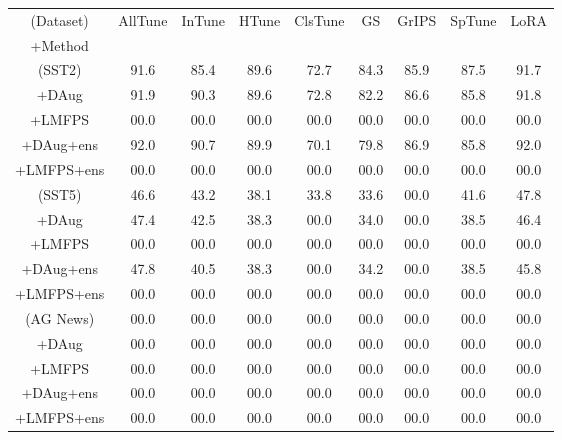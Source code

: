 \documentclass[11pt]{article}
\begin{document}
\begin{table*}
\begin{tabular}{c | c | c | c | c | c | c | c | c}
\hline
(Dataset) & AllTune & InTune & HTune & ClsTune & GS & GrIPS & SpTune & LoRA \\
\small+Method &  &  &  &  &  &  &  &  \\
\hline
(SST2) & \small91.6 & \small85.4 & \small89.6 & \small72.7 & \small84.3 & \small85.9 & \small87.5 & \small91.7 \\
\small+DAug & \small91.9 & \small90.3 & \small89.6 & \small72.8 & \small82.2 & \small86.6 & \small85.8 & \small91.8\\
\small+LMFPS  & \small00.0 & \small00.0 & \small00.0 & \small00.0 & \small00.0 & \small00.0 & \small00.0 & \small00.0\\
\small+DAug+ens & \small92.0 & \small90.7 & \small89.9 & \small70.1 & \small79.8 & \small86.9 & \small85.8 & \small92.0\\
\small+LMFPS+ens  & \small00.0 & \small00.0 & \small00.0 & \small00.0 & \small00.0 & \small00.0 & \small00.0 & \small00.0\\
\hline
(SST5) & \small46.6 & \small43.2 & \small38.1 & \small33.8 & \small33.6 & \small00.0 & \small41.6 & \small47.8\\
\small+DAug & \small47.4 & \small42.5 & \small38.3 & \small00.0 & \small34.0 & \small00.0 & \small38.5 & \small46.4\\
\small+LMFPS & \small00.0 & \small00.0 & \small00.0 & \small00.0 & \small00.0 & \small00.0 & \small00.0 & \small00.0\\
\small+DAug+ens & \small47.8 & \small40.5 & \small38.3 & \small00.0 & \small34.2 & \small00.0 & \small38.5 & \small45.8\\
\small+LMFPS+ens  & \small00.0 & \small00.0 & \small00.0 & \small00.0 & \small00.0 & \small00.0 & \small00.0 & \small00.0\\
\hline
(AG News) & \small00.0 & \small00.0 & \small00.0 & \small00.0 & \small00.0 & \small00.0 & \small00.0 & \small00.0\\
\small+DAug & \small00.0 & \small00.0 & \small00.0 & \small00.0 & \small00.0 & \small00.0 & \small00.0 & \small00.0\\
\small+LMFPS & \small00.0 & \small00.0 & \small00.0 & \small00.0 & \small00.0 & \small00.0 & \small00.0 & \small00.0\\
\small+DAug+ens & \small00.0 & \small00.0 & \small00.0 & \small00.0 & \small00.0 & \small00.0 & \small00.0 & \small00.0\\
\small+LMFPS+ens  & \small00.0 & \small00.0 & \small00.0 & \small00.0 & \small00.0 & \small00.0 & \small00.0 & \small00.0\\

\end{tabular}
\end{table*}
\end{document}

